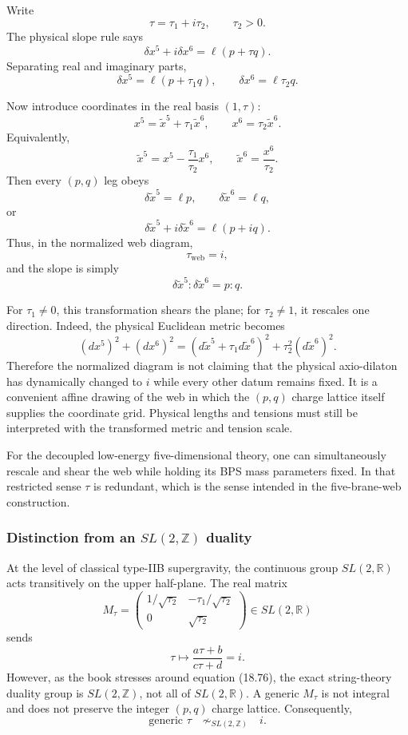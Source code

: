 \documentclass[
  10pt,
  a4paper,
  openany]{book}
\begin{document}
Write \[
\tau=\tau_1+i\tau_2,
\qquad
\tau_2>0.
\] The physical slope rule says \[
\delta x^5+i\delta x^6
=\ell\left(p+\tau q\right).
\] Separating real and imaginary parts, \[
\delta x^5
=\ell(p+\tau_1q),
\qquad
\delta x^6
=\ell\tau_2q.
\]

Now introduce coordinates in the real basis \((1,\tau)\): \[
\boxed{
x^5=\tilde x^5+\tau_1\tilde x^6,
\qquad
x^6=\tau_2\tilde x^6
}.
\] Equivalently, \[
\boxed{
\tilde x^5=x^5-\frac{\tau_1}{\tau_2}x^6,
\qquad
\tilde x^6=\frac{x^6}{\tau_2}
}.
\] Then every \((p,q)\) leg obeys \[
\delta\tilde x^5=\ell p,
\qquad
\delta\tilde x^6=\ell q,
\] or \[
\boxed{
\delta\tilde x^5+i\delta\tilde x^6
=\ell(p+iq)
}.
\] Thus, in the normalized web diagram, \[
\boxed{\tau_{\mathrm{web}}=i},
\] and the slope is simply \[
\delta\tilde x^5:\delta\tilde x^6=p:q.
\]

For \(\tau_1\neq0\), this transformation shears the plane; for
\(\tau_2\neq1\), it rescales one direction. Indeed, the physical
Euclidean metric becomes \[
(dx^5)^2+(dx^6)^2
=
\left(d\tilde x^5+\tau_1d\tilde x^6\right)^2
+\tau_2^2(d\tilde x^6)^2.
\] Therefore the normalized diagram is not claiming that the physical
axio-dilaton has dynamically changed to \(i\) while every other datum
remains fixed. It is a convenient affine drawing of the web in which the
\((p,q)\) charge lattice itself supplies the coordinate grid. Physical
lengths and tensions must still be interpreted with the transformed
metric and tension scale.

For the decoupled low-energy five-dimensional theory, one can
simultaneously rescale and shear the web while holding its BPS mass
parameters fixed. In that restricted sense \(\tau\) is redundant, which
is the sense intended in the five-brane-web construction.

\subsubsection{\texorpdfstring{Distinction from an \(SL(2,\mathbb Z)\)
duality}{Distinction from an SL(2,\textbackslash mathbb Z) duality}}\label{distinction-from-an-sl2mathbb-z-duality}

At the level of classical type-IIB supergravity, the continuous group
\(SL(2,\mathbb R)\) acts transitively on the upper half-plane. The real
matrix \[
M_\tau
=
\begin{pmatrix}
1/\sqrt{\tau_2}&-\tau_1/\sqrt{\tau_2}\\
0&\sqrt{\tau_2}
\end{pmatrix}
\in SL(2,\mathbb R)
\] sends \[
\tau\longmapsto
\frac{a\tau+b}{c\tau+d}
=i.
\] However, as the book stresses around equation (18.76), the exact
string-theory duality group is \(SL(2,\mathbb Z)\), not all of
\(SL(2,\mathbb R)\). A generic \(M_\tau\) is not integral and does not
preserve the integer \((p,q)\) charge lattice. Consequently, \[
\text{generic }\tau
\quad\not\sim_{SL(2,\mathbb Z)}\quad
i.
\]
\end{document}
